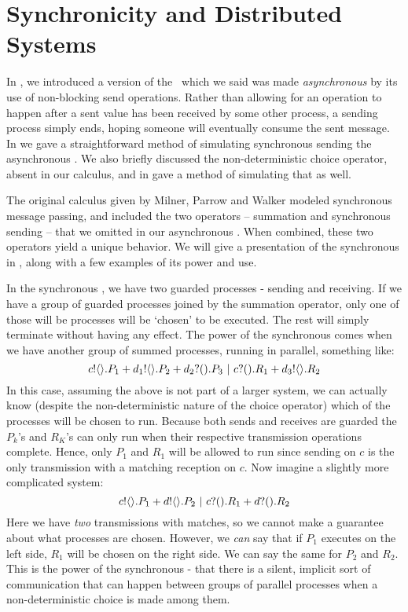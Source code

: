 
\chapter{Synchronicity and Distributed Systems}
In , we introduced a version of the \picalc\ which we said was made \emph{asynchronous} by its use of non-blocking send operations.  Rather than allowing for an operation to happen after a sent value has been received by some other process, a sending process simply ends, hoping someone will eventually consume the sent message.  In  we gave a straightforward method of simulating synchronous sending the asynchronous \picalc.  We also briefly discussed the non-deterministic choice operator, absent in our calculus, and in  gave a method of simulating that as well.

The original calculus given by Milner, Parrow and Walker modeled synchronous message passing, and included the two operators -- summation and synchronous sending -- that we omitted in our asynchronous \picalc.  When combined, these two operators yield a unique behavior.  We will give a presentation of the synchronous \picalc in , along with a few examples of its power and use.

In the synchronous \picalc, we have two guarded processes - sending and receiving.  If we have a group of guarded processes joined by the summation operator, only one of those will be processes will be `chosen' to be executed.  The rest will simply terminate without having any effect.  The power of the synchronous \picalc comes when we have another group of summed processes, running in parallel, something like: 
\[
	{c}!\langle{}\rangle.P_1 + {d_1}!\langle{}\rangle.P_2 + {d_2}?({}).P_3 \ |\  {c}?({}).R_1 + {d_3}!\langle{}\rangle.R_2
\]
In this case, assuming the above is not part of a larger system, we can actually know (despite the non-deterministic nature of the choice operator) which of the processes will be chosen to run.  Because both sends and receives are guarded the $P_k$'s and $R_K$'s can only run when their respective transmission operations complete.  Hence, only $P_1$ and $R_1$ will be allowed to run since sending on $c$ is the only transmission with a matching reception on $c$.  Now imagine a slightly more complicated system:
\[
	{c}!\langle{}\rangle.P_1 + {d}!\langle{}\rangle.P_2 \ |\  {c}?({}).R_1 + {d}?({}).R_2
\]
Here we have \emph{two} transmissions with matches, so we cannot make a guarantee about what processes are chosen.  However, we \emph{can} say that if $P_1$ executes on the left side, $R_1$ will be chosen on the right side.  We can say the same for $P_2$ and $R_2$.  This is the power of the synchronous \picalc - that there is a silent, implicit sort of communication that can happen between groups of parallel processes when a non-deterministic choice is made among them.

